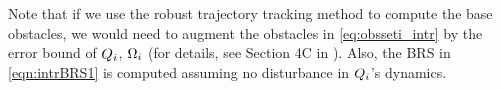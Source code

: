 \begin{remark}
Note that if we use the robust trajectory tracking method to compute the base obstacles, we would need to augment the obstacles in \eqref{eq:obsseti_intr} by the error bound of $Q_i$, $\Omega_i$ (for details, see Section 4C in \cite{Bansal2017}). Also, the BRS in \eqref{eqn:intrBRS1} is computed assuming no disturbance in $Q_i$'s dynamics.
\end{remark}